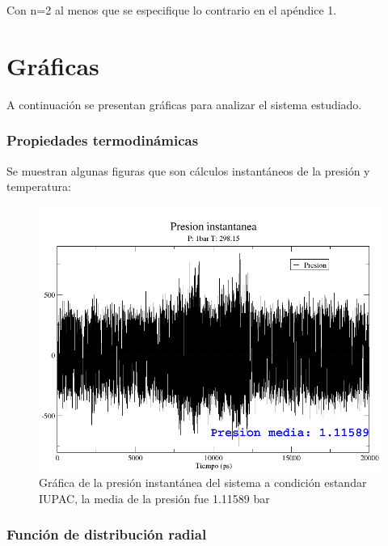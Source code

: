 Con n=2 al menos que se especifique lo contrario en el apéndice 1.

\section{Gráficas}

A continuación se presentan gráficas para analizar el sistema estudiado.

\subsubsection{Propiedades termodinámicas}

Se muestran algunas figuras que son cálculos instantáneos de la presión y temperatura:

\begin{figure}[!h]
    \centering
    \includegraphics[width=.9\textwidth,keepaspectratio=true]{Pres298.png}
    \caption{Gráfica de la presión instantánea del sistema a condición estandar IUPAC, la media de la presión fue 1.11589 bar}
    \label{fig:Enertot298.15}
\end{figure}

\subsubsection{Función de distribución radial}

